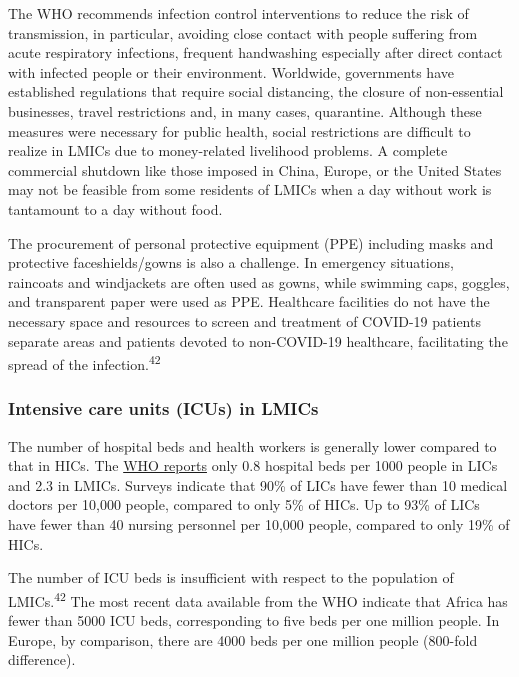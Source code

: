 \documentclass[
  11pt,
  paper=a4,
  ,captions=tableheading
]{scrartcl}
\begin{document}
The WHO recommends infection control interventions to reduce the risk of
transmission, in particular, avoiding close contact with people
suffering from acute respiratory infections, frequent handwashing
especially after direct contact with infected people or their
environment. Worldwide, governments have established regulations that
require social distancing, the closure of non-essential businesses,
travel restrictions and, in many cases, quarantine. Although these
measures were necessary for public health, social restrictions are
difficult to realize in LMICs due to money-related livelihood problems.
A complete commercial shutdown like those imposed in China, Europe, or
the United States may not be feasible from some residents of LMICs when
a day without work is tantamount to a day without food.

The procurement of personal protective equipment (PPE) including masks
and protective faceshields/gowns is also a challenge. In emergency
situations, raincoats and windjackets are often used as gowns, while
swimming caps, goggles, and transparent paper were used as PPE.
Healthcare facilities do not have the necessary space and resources to
screen and treatment of COVID-19 patients separate areas and patients
devoted to non-COVID-19 healthcare, facilitating the spread of the
infection.\textsuperscript{42}

\hypertarget{intensive-care-units-icus-in-lmics}{%
\subsubsection*{Intensive care units (ICUs) in
LMICs}\label{intensive-care-units-icus-in-lmics}}

The number of hospital beds and health workers is generally lower
compared to that in HICs. The
\href{https://www.who.int/data/gho/data/indicators/indicator-details/GHO/hospital-beds-(per-10-000-population)?bookmarkId=57250f95-5dcc-4a57-84d7-1b2faddeff80}{WHO
reports} only 0.8 hospital beds per 1000 people in LICs and 2.3 in
LMICs. Surveys indicate that 90\% of LICs have fewer than 10 medical
doctors per 10,000 people, compared to only 5\% of HICs. Up to 93\% of
LICs have fewer than 40 nursing personnel per 10,000 people, compared to
only 19\% of HICs.

The number of ICU beds is insufficient with respect to the population of
LMICs.\textsuperscript{42} The most recent data available from the WHO
indicate that Africa has fewer than 5000 ICU beds, corresponding to five
beds per one million people. In Europe, by comparison, there are 4000
beds per one million people (800-fold difference).
\end{document}
